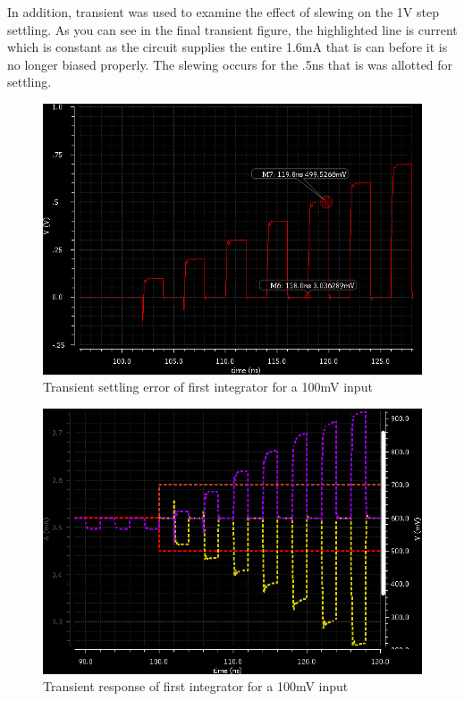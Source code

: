 \documentclass[conference]{IEEEtran}
\begin{document}
In addition, transient was used to examine the effect of slewing on the 1V step settling. As you can see in the final transient figure, the highlighted line is current which is constant as the circuit supplies the entire 1.6mA that is can before it is no longer biased properly. The slewing occurs for the .5ns that is was allotted for settling.


\begin{figure}[h]
\centering
\includegraphics[width=\linewidth]{piktures/st1_error}
\caption{Transient settling error of first integrator for a 100mV input}
\label{stage1-tran}
\end{figure}

\begin{figure}[h]
\centering
\includegraphics[width=\linewidth]{piktures/st1_trans}
\caption{Transient response of first integrator for a 100mV input}
\label{stage1-tran}
\end{figure}
\end{document}
